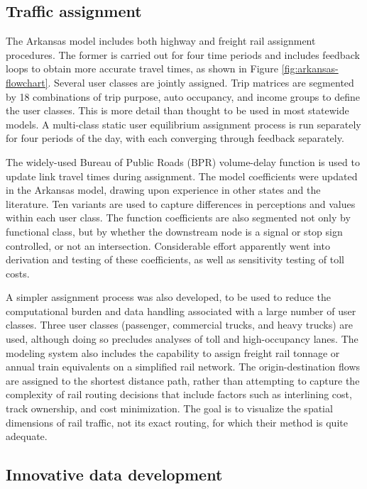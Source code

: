 \subsection{Traffic assignment}

The Arkansas model includes both highway and freight rail assignment procedures. The former is carried out for four time periods and includes feedback loops to obtain more accurate travel times, as shown in Figure \ref{fig:arkansas-flowchart}. Several user classes are jointly assigned. Trip matrices are segmented by 18 combinations of trip purpose, auto occupancy, and income groups to define the user classes. This is more detail than thought to be used in most statewide models. A multi-class static user equilibrium assignment process is run separately for four periods of the day, with each converging through feedback separately.

The widely-used Bureau of Public Roads (BPR) volume-delay function is used to update link travel times during assignment. The model coefficients were updated in the Arkansas model, drawing upon experience in other states and the literature. Ten variants are used to capture differences in perceptions and values within each user class. The function coefficients are also segmented not only by functional class, but by whether the downstream node is a signal or stop sign controlled, or not an intersection. Considerable effort apparently went into derivation and testing of these coefficients, as well as sensitivity testing of toll costs.

A simpler assignment process was also developed, to be used to reduce the computational burden and data handling associated with a large number of user classes. Three user classes (passenger, commercial trucks, and heavy trucks) are used, although doing so precludes analyses of toll and high-occupancy lanes. The modeling system also includes the capability to assign freight rail tonnage or annual train equivalents on a simplified rail network. The origin-destination flows are assigned to the shortest distance path, rather than attempting to capture the complexity of rail routing decisions that include factors such as interlining cost, track ownership, and cost minimization. The goal is to visualize the spatial dimensions of rail traffic, not its exact routing, for which their method is quite adequate.

\subsection{Innovative data development}


